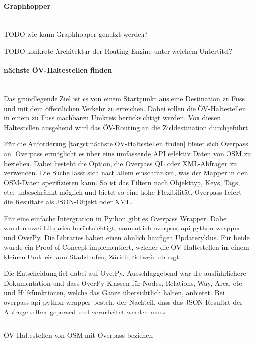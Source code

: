 \paragraph{Graphhopper}~\\
\label{architektur:Graphhopper}
TODO wie kann Graphhopper genutzt werden?


TODO konkrete Architektur der Routing Engine unter welchem Untertitel?


\paragraph{nächste ÖV-Haltestellen finden}~\\
\label{architektur:nächste ÖV-Haltestellen finden}
Das grundlegende Ziel ist es von einem Startpunkt aus eine Destination zu Fuss und mit dem öffentlichen Verkehr zu erreichen. Dabei sollen die ÖV-Haltestellen in einem zu Fuss machbaren Umkreis berücksichtigt werden. Von diesen Haltestellen ausgehend wird das ÖV-Routing an die Zieldestination durchgeführt.

Für die Anforderung \ref{target:nächste ÖV-Haltestellen finden} bietet sich Overpass an. Overpass ermöglicht es über eine umfassende \ac{API} selektiv Daten von \ac{OSM} zu beziehen. Dabei besteht die Option, die Overpass \ac{QL} oder XML-Abfragen zu verwenden. Die Suche lässt sich nach allem einschränken, was der Mapper in den \ac{OSM}-Daten spezifizieren kann. So ist das Filtern nach Objekttyp, Keys, Tags, etc. unbeschränkt möglich und bietet so eine hohe Flexibilität. Overpass liefert die Resultate als JSON-Objekt oder XML. 

Für eine einfache Intergration in Python gibt es Overpass Wrapper. Dabei wurden zwei Libraries berücksichtigt, namentlich overpass-api-python-wrapper und OverPy. Die Libraries haben einen ähnlich häufigen Updatezyklus. Für beide wurde ein Proof of Concept implementiert, welcher die ÖV-Haltestellen im einem kleinen Umkreis vom Stadelhofen, Zürich, Schweiz abfragt.

Die Entscheidung fiel dabei auf OverPy. Ausschlaggebend war die ausführlichere Dokumentation und dass OverPy Klassen für Nodes, Relations, Way, Area, etc. und Hilfsfunktionen, welche das Ganze übersichtlich halten, anbietet. Bei overpass-api-python-wrapper besteht der Nachteil, dass das JSON-Resultat der Abfrage selber geparsed und verarbeitet werden muss.

\begin{listing}[ht]
    \inputminted{python}{projectdoc/listing/get_public_transport_stops_overpass.py}
    \caption{ÖV-Haltestellen von \acs{OSM} mit Overpass beziehen}
    \label{get_public_transport_stops_overpass}
\end{listing}

